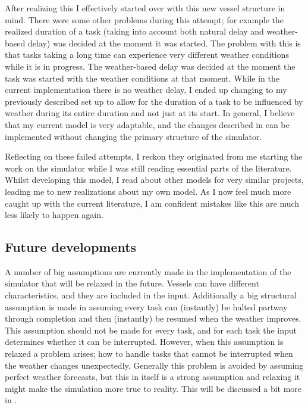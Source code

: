 \documentclass[a4paper,12pt]{article}
\begin{document}
After realizing this I effectively started over with this new vessel structure in mind. There were some other problems during this attempt; for example the realized duration of a task (taking into account both natural delay and weather-based delay) was decided at the moment it was started. The problem with this is that tasks taking a long time can experience very different weather conditions while it is in progress. The weather-based delay was decided at the moment the task was started with the weather conditions at that moment. While in the current implementation there is no weather delay, I ended up changing to my previously described set up to allow for the duration of a task to be influenced by weather during its entire duration and not just at its start. In general, I believe that my current model is very adaptable, and the changes described in  can be implemented without changing the primary structure of the simulator. 

Reflecting on these failed attempts, I reckon they originated from me starting the work on the simulator while I was still reading essential parts of the literature. Whilst developing this model, I read about other models for very similar projects, leading me to new realizations about my own model. As I now feel much more caught up with the current literature, I am confident mistakes like this are much less likely to happen again. 

\subsection{Future developments} \label{ss:simfut}
A number of big assumptions are currently made in the implementation of the simulator that will be relaxed in the future. Vessels can have different characteristics, and they are included in the input. Additionally a big structural assumption is made in assuming every task can (instantly) be halted partway through completion and then (instantly) be resumed when the weather improves. This assumption should not be made for every task, and for each task the input determines whether it can be interrupted. However, when this assumption is relaxed a problem arises; how to handle tasks that cannot be interrupted when the weather changes unexpectedly. Generally this problem is avoided by assuming perfect weather forecasts, but this in itself is a strong assumption and relaxing it might make the simulation more true to reality. This will be discussed a bit more in . 
\end{document}
